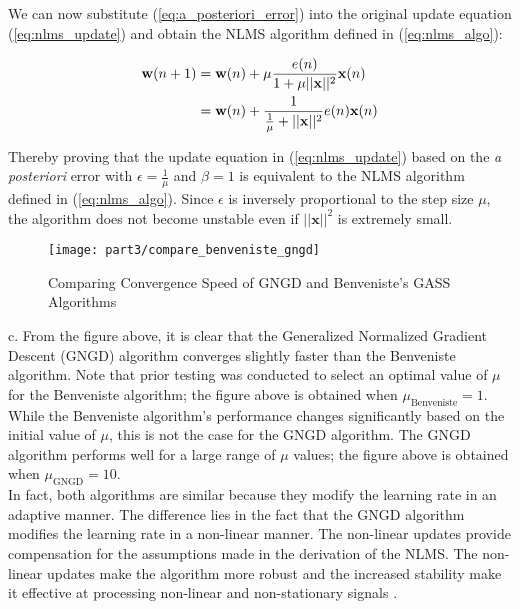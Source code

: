\noindent{}We can now substitute (\ref{eq:a_posteriori_error}) into the original update equation (\ref{eq:nlms_update}) and obtain the NLMS algorithm defined in (\ref{eq:nlms_algo}):

\begin{align}
\textbf{w}(n+1) &= \textbf{w}(n) + \mu \frac{e(n)}{1+\mu ||\textbf{\textbf{x}}||^2}\textbf{x}(n) \nonumber\\
&= \textbf{w}(n) + \frac{1}{\frac{1}{\mu}+ ||\textbf{\textbf{x}}||^2}e(n)\textbf{x}(n) 
\end{align}

\noindent{}Thereby proving that the update equation in (\ref{eq:nlms_update}) based on the \textit{a posteriori} error with $\epsilon=\frac{1}{\mu}$ and $\beta=1$ is equivalent to the NLMS algorithm defined in (\ref{eq:nlms_algo}). Since $\epsilon$ is inversely proportional to the step size $\mu$, the algorithm does not become unstable even if $||\textbf{x}||^2$ is extremely small.

\begin{figure}[H]
\centering{}
\texttt{[image: part3/compare\_benveniste\_gngd]}
\caption{Comparing Convergence Speed of GNGD and Benveniste's GASS Algorithms}
\end{figure}

\noindent{}c. From the figure above, it is clear that the Generalized Normalized Gradient Descent (GNGD) algorithm converges slightly faster than the Benveniste algorithm. Note that prior testing was conducted to select an optimal value of $\mu$ for the Benveniste algorithm; the figure above is obtained when $\mu_{\text{Benveniste}}=1$. While the Benveniste algorithm's performance changes significantly based on the initial value of $\mu$, this is not the case for the GNGD algorithm. The GNGD algorithm performs well for a large range of $\mu$ values; the figure above is obtained when $\mu_{\text{GNGD}}=10$.\\

\noindent{}In fact, both algorithms are similar because they modify the learning rate in an adaptive manner. The difference lies in the fact that the GNGD algorithm modifies the learning rate in a non-linear manner. The non-linear updates provide compensation for the assumptions made in the derivation of the NLMS. The non-linear updates make the algorithm more robust and the increased stability make it effective at processing non-linear and non-stationary signals \cite{mandic2004generalized}.\\

